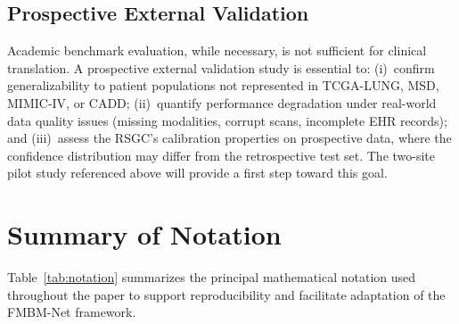 \documentclass[a4paper,fleqn]{cas-dc}
\begin{document}
\subsection{Prospective External Validation}

Academic benchmark evaluation, while necessary, is not sufficient for clinical
translation. A prospective external validation study is essential to:
(i)~confirm generalizability to patient populations not represented in
TCGA-LUNG, MSD, MIMIC-IV, or CADD; (ii)~quantify performance degradation
under real-world data quality issues (missing modalities, corrupt scans,
incomplete EHR records); and (iii)~assess the RSGC's calibration properties
on prospective data, where the confidence distribution may differ from the
retrospective test set. The two-site pilot study referenced above will
provide a first step toward this goal.

\section{Summary of Notation}
\label{sec:notation}

Table~\ref{tab:notation} summarizes the principal mathematical notation used
throughout the paper to support reproducibility and facilitate adaptation of
the FMBM-Net framework.
\end{document}
